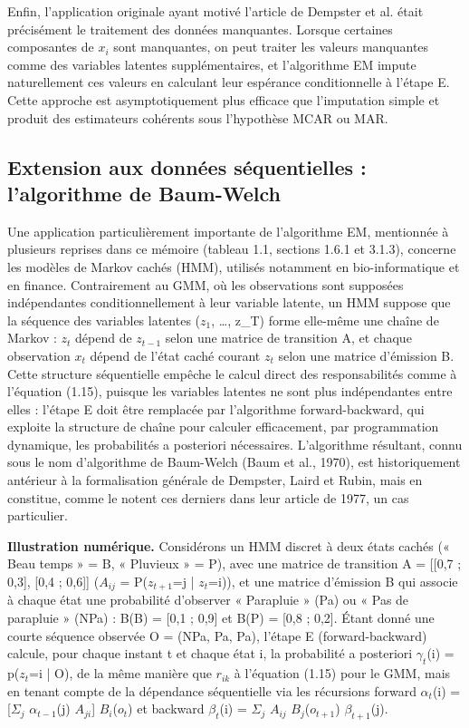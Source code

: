 Enfin, l'application originale ayant motivé l'article de Dempster et al. était précisément le traitement des données manquantes. Lorsque certaines composantes de $x_{i}$ sont manquantes, on peut traiter les valeurs manquantes comme des variables latentes supplémentaires, et l'algorithme EM impute naturellement ces valeurs en calculant leur espérance conditionnelle à l'étape E. Cette approche est asymptotiquement plus efficace que l'imputation simple et produit des estimateurs cohérents sous l'hypothèse MCAR ou MAR.

\subsection{Extension aux données séquentielles : l'algorithme de Baum-Welch}
Une application particulièrement importante de l'algorithme EM, mentionnée à plusieurs reprises dans ce mémoire (tableau 1.1, sections 1.6.1 et 3.1.3), concerne les modèles de Markov cachés (HMM), utilisés notamment en bio-informatique et en finance. Contrairement au GMM, où les observations sont supposées indépendantes conditionnellement à leur variable latente, un HMM suppose que la séquence des variables latentes ($z_{1}$, \ldots{}, z\_T) forme elle-même une chaîne de Markov : $z_{t}$ dépend de $z_{t-1}$ selon une matrice de transition A, et chaque observation $x_{t}$ dépend de l'état caché courant $z_{t}$ selon une matrice d'émission B. Cette structure séquentielle empêche le calcul direct des responsabilités comme à l'équation (1.15), puisque les variables latentes ne sont plus indépendantes entre elles : l'étape E doit être remplacée par l'algorithme forward-backward, qui exploite la structure de chaîne pour calculer efficacement, par programmation dynamique, les probabilités a posteriori nécessaires. L'algorithme résultant, connu sous le nom d'algorithme de Baum-Welch (Baum et al., 1970), est historiquement antérieur à la formalisation générale de Dempster, Laird et Rubin, mais en constitue, comme le notent ces derniers dans leur article de 1977, un cas particulier.

\textbf{Illustration numérique. }Considérons un HMM discret à deux états cachés (« Beau temps » = B, « Pluvieux » = P), avec une matrice de transition A = [[0,7 ; 0,3], [0,4 ; 0,6]] ($A_{ij}$ = P($z_{t+1}$=j | $z_{t}$=i)), et une matrice d'émission B qui associe à chaque état une probabilité d'observer « Parapluie » (Pa) ou « Pas de parapluie » (NPa) : B(B) = [0,1 ; 0,9] et B(P) = [0,8 ; 0,2]. Étant donné une courte séquence observée O = (NPa, Pa, Pa), l'étape E (forward-backward) calcule, pour chaque instant t et chaque état i, la probabilité a posteriori $\gamma _{t}$(i) = p($z_{t}$=i | O), de la même manière que $r_{ik}$ à l'équation (1.15) pour le GMM, mais en tenant compte de la dépendance séquentielle via les récursions forward $\alpha _{t}$(i) = [$\Sigma _{j}$ $\alpha _{t-1}$(j) $A_{ji}$] $B_{i}$($o_{t}$) et backward $\beta _{t}$(i) = $\Sigma _{j}$ $A_{ij}$ $B_{j}$($o_{t+1}$) $\beta _{t+1}$(j).

